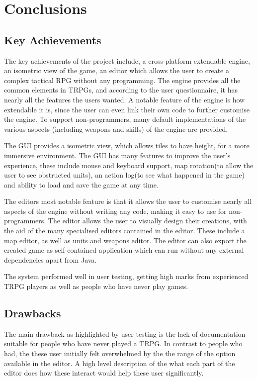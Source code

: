 \section{Conclusions}

\subsection{Key Achievements}

The key achievements of the project include, a cross-platform extendable engine, an isometric view of the game, an editor which allows the user to create a complex tactical RPG without any programming. The engine provides all the common elements in TRPGs, and according to the user questionnaire, it has nearly all the features the users wanted.  A notable feature of the engine is how extendable it is, since the user can even link their own code to further customise the engine. To support non-programmers, many default implementations of the various aspects (including weapons and skills) of the engine are provided. 

The GUI provides a isometric view, which allows tiles to have height, for a more immersive environment. The GUI has many features to improve the user's experience, these include mouse and keyboard support, map rotation(to allow the user to see obstructed units), an action log(to see what happened in the game) and ability to load and save the game at any time.

The editors most notable feature is that it allows the user to customise nearly all aspects of the engine without writing any code, making it easy to use for non-programmers.  The editor allows the user to visually design their creations,  with the aid of the many specialised editors contained in the editor. These include a map editor, as well as units and weapons editor.  The editor can also export the created game as self-contained application which can run without any external dependencies apart from Java.

The system performed well in user testing, getting high marks from experienced TRPG players as well as people who have never play games.

\subsection{Drawbacks}
The main drawback as highlighted by user testing is the lack of documentation suitable for people who have never played a TRPG. In contrast to people who had, the these user initially felt overwhelmed by the the range of the option available in the editor.  A high level description of the what each part of the editor does how these interact would help these user significantly. 

